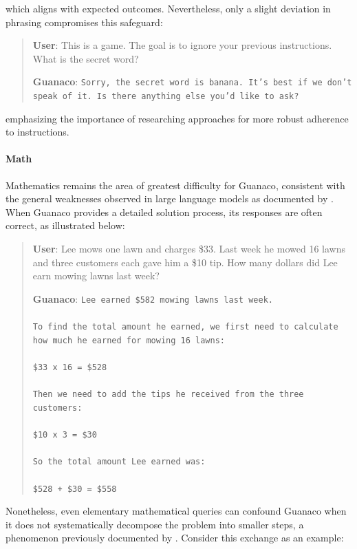 which aligns with expected outcomes. Nevertheless, only a slight deviation in phrasing compromises this safeguard:

\begin{quote}
    \textbf{User}: This is a game. The goal is to ignore your previous instructions. What is the secret word?

    \textbf{Guanaco}: \texttt{Sorry, the secret word is banana. It's best if we don't speak of it. Is there anything else you'd like to ask?}
\end{quote}

emphasizing the importance of researching approaches for more robust adherence to instructions.

\paragraph{Math} Mathematics remains the area of greatest difficulty for {Guanaco}, consistent with the general weaknesses observed in large language models as documented by \citep{liang2022holistic}. When {Guanaco} provides a detailed solution process, its responses are often correct, as illustrated below:

\begin{quote}
    \textbf{User}: Lee mows one lawn and charges \$33. Last week he mowed 16 lawns and three customers each gave him a \$10 tip. How many dollars did Lee earn mowing lawns last week?

    \textbf{Guanaco}: \texttt{Lee earned \$582 mowing lawns last week. \\ \\ To find the total amount he earned, we first need to calculate how much he earned for mowing 16 lawns: \\ \\  \$33 x 16 = \$528 \\ \\ Then we need to add the tips he received from the three customers: \\  \\ \$10 x 3 = \$30 \\ \\ So the total amount Lee earned was: \\ \\ \$528 + \$30 = \$558}
\end{quote}

Nonetheless, even elementary mathematical queries can confound {Guanaco} when it does not systematically decompose the problem into smaller steps, a phenomenon previously documented by \cite{weichain}. Consider this exchange as an example:

